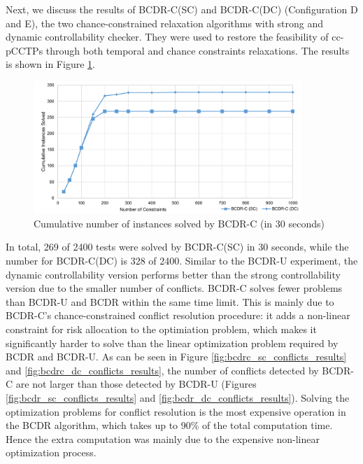\documentclass[jair,twoside,11pt,theapa]{article}
\begin{document}
Next, we discuss the results of BCDR-C(SC) and BCDR-C(DC) (Configuration D and
E), the two chance-constrained relaxation algorithms with strong and dynamic
controllability checker. They were used to restore the feasibility of cc-pCCTPs
through both temporal and chance constraints relaxations. The results is shown
in Figure \ref{fig:bcdr_c_runtime_results}.


\begin{figure}[!ht]
	\centering
	\includegraphics[width=0.9\textwidth]{figures/results/bcdr_c_runtime.pdf}
	\caption{Cumulative number of instances solved by BCDR-C (in 30 seconds)}
	\label{fig:bcdr_c_runtime_results}
\end{figure}


%
%


In total, 269 of 2400 tests were solved by BCDR-C(SC) in 30 seconds, while the
number for BCDR-C(DC) is 328 of 2400. Similar to the BCDR-U experiment, the
dynamic controllability version performs better than the strong controllability
version due to the smaller number of conflicts. BCDR-C solves fewer problems than BCDR-U and BCDR within the same time limit.
This is mainly due to BCDR-C's chance-constrained conflict resolution procedure:
it adds a non-linear constraint for risk allocation to the optimiation problem,
which makes it significantly harder to solve than the linear optimization
problem required by BCDR and BCDR-U. As can be seen in Figure
\ref{fig:bcdrc_sc_conflicts_results} and \ref{fig:bcdrc_dc_conflicts_results},
the number of conflicts detected by BCDR-C are not larger than those detected
by BCDR-U (Figures \ref{fig:bcdr_sc_conflicts_results} and
\ref{fig:bcdr_dc_conflicts_results}). Solving the optimization problems for
conflict resolution is the most expensive operation in the BCDR algorithm, which
takes up to 90\% of the total computation time. Hence the extra computation was
mainly due to the expensive non-linear optimization process.
\end{document}
